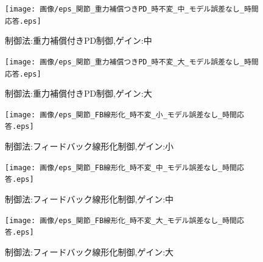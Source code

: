 \documentclass[a4paper,11pt,titlepage]{jsarticle}
\begin{document}
\begin{figure}[H]
  \begin{center}
    \texttt{[image: 画像/eps\_関節\_重力補償つきPD\_時不変\_中\_モデル誤差なし\_時間応答.eps]}
    \caption{制御法:重力補償付きPD制御,ゲイン:中}
    \label{PDG/ゲイン中}
  \end{center}
\end{figure}

\begin{figure}[H]
  \begin{center}
    \texttt{[image: 画像/eps\_関節\_重力補償つきPD\_時不変\_大\_モデル誤差なし\_時間応答.eps]}
    \caption{制御法:重力補償付きPD制御,ゲイン:大}
    \label{PDG/ゲイン大}
  \end{center}
\end{figure}

\begin{figure}[H]
  \begin{center}
    \texttt{[image: 画像/eps\_関節\_FB線形化\_時不変\_小\_モデル誤差なし\_時間応答.eps]}
    \caption{制御法:フィードバック線形化制御,ゲイン:小}
    \label{FB/ゲイン小}
  \end{center}
\end{figure}

\begin{figure}[H]
  \begin{center}
    \texttt{[image: 画像/eps\_関節\_FB線形化\_時不変\_中\_モデル誤差なし\_時間応答.eps]}
    \caption{制御法:フィードバック線形化制御,ゲイン:中}
    \label{FB/ゲイン中}
  \end{center}
\end{figure}

\begin{figure}[H]
  \begin{center}
    \texttt{[image: 画像/eps\_関節\_FB線形化\_時不変\_大\_モデル誤差なし\_時間応答.eps]}
    \caption{制御法:フィードバック線形化制御,ゲイン:大}
    \label{FB/ゲイン大}
  \end{center}
\end{figure}
\end{document}
